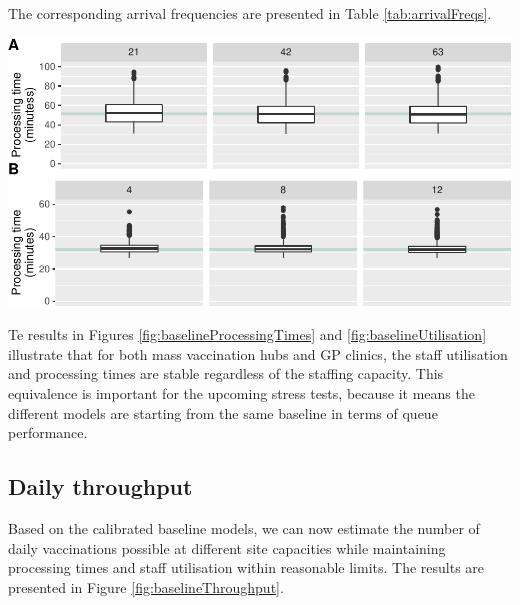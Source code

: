 \documentclass{article}
\let\origfigure\figure
\let\endorigfigure\endfigure
\renewenvironment{figure}[1][2] {
    \expandafter\origfigure\expandafter[H]
} {
    \endorigfigure
}
\begin{document}
The corresponding arrival frequencies are presented in Table
\ref{tab:arrivalFreqs}.

\begin{figure}

{\centering \includegraphics{Preprint_files/figure-latex/baselineProcessingTimes-1} 

}

\caption{Baseline processing times for the mass vaccination hub (A) and GP vaccination clinic (B)}\label{fig:baselineProcessingTimes}
\end{figure}

Te results in Figures \ref{fig:baselineProcessingTimes} and
\ref{fig:baselineUtilisation} illustrate that for both mass vaccination
hubs and GP clinics, the staff utilisation and processing times are
stable regardless of the staffing capacity. This equivalence is
important for the upcoming stress tests, because it means the different
models are starting from the same baseline in terms of queue
performance.

\hypertarget{daily-throughput}{%
\subsection{Daily throughput}\label{daily-throughput}}

Based on the calibrated baseline models, we can now estimate the number
of daily vaccinations possible at different site capacities while
maintaining processing times and staff utilisation within reasonable
limits. The results are presented in Figure
\ref{fig:baselineThroughput}.
\end{document}
